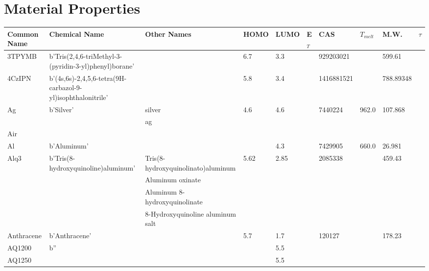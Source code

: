 \documentclass[../thesis.tex]{subfiles}
\begin{document}
\chapter{Material Properties}\small
\begin{landscape}
\begin{longtable}{| p{} | p{} | p{} | p{} | p{} | p{} | p{} | p{} | p{} | p{} | }

 \hline 
\textbf{Common Name} & \textbf{Chemical Name} & \textbf{Other Names} & \textbf{HOMO} & \textbf{LUMO} & E$_T$ & \textbf{CAS} & $T_{melt}$ & \textbf{M.W.} & $\tau$ \\
 \hline 
\endhead3TPYMB & b'Tris(2,4,6-triMethyl-3-(pyridin-3-yl)phenyl)borane' &  & 6.7 & 3.3 &  & 929203021 &  & 599.61 &  \\ 
 
 \hline 
4CzIPN & b'(4s,6s)-2,4,5,6-tetra(9H-carbazol-9-yl)isophthalonitrile' &  & 5.8 & 3.4 &  & 1416881521 &  & 788.89348 &  \\ 
 
 \hline 
Ag & b'Silver' & silver & 4.6 & 4.6 &  & 7440224 & 962.0 & 107.868 &  \\ 
 & & ag &  &  &  &  & & & \\ 
 
 \hline 
Air &  &  &  &  &  &  &  &  &  \\ 
 
 \hline 
Al & b'Aluminum' &  &  & 4.3 &  & 7429905 & 660.0 & 26.981 &  \\ 
 
 \hline 
Alq3 & b'Tris(8-hydroxyquinoline)aluminum' & Tris(8-hydroxyquinolinato)aluminum & 5.62 & 2.85 &  & 2085338 &  & 459.43 &  \\ 
 & & Aluminum oxinate &  &  &  &  & & & \\ 
 & & Aluminum 8-hydroxyquinolinate &  &  &  &  & & & \\ 
 & & 8-Hydroxyquinoline aluminum salt &  &  &  &  & & & \\ 
 
 \hline 
Anthracene & b'Anthracene' &  & 5.7 & 1.7 &  & 120127 &  & 178.23 &  \\ 
 
 \hline 
AQ1200 & b'' &  &  & 5.5 &  &  &  &  &  \\ 
 
 \hline 
AQ1250 &  &  &  & 5.5 &  &  &  &  &  \\ 
 

\end{longtable}
\end{landscape}
\end{document}
